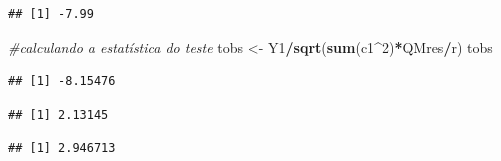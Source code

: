 \documentclass[
]{book}
\newenvironment{Shaded}{\begin{snugshade}}{\end{snugshade}}
\newcommand{\CommentTok}[1]{\textcolor[rgb]{0.56,0.35,0.01}{\textit{#1}}}
\newcommand{\DecValTok}[1]{\textcolor[rgb]{0.00,0.00,0.81}{#1}}
\newcommand{\FloatTok}[1]{\textcolor[rgb]{0.00,0.00,0.81}{#1}}
\newcommand{\KeywordTok}[1]{\textcolor[rgb]{0.13,0.29,0.53}{\textbf{#1}}}
\newcommand{\NormalTok}[1]{#1}
\newcommand{\OperatorTok}[1]{\textcolor[rgb]{0.81,0.36,0.00}{\textbf{#1}}}
\newcommand{\StringTok}[1]{\textcolor[rgb]{0.31,0.60,0.02}{#1}}
\begin{document}
\begin{verbatim}
## [1] -7.99
\end{verbatim}

\begin{Shaded}
\begin{Highlighting}[]
\CommentTok{#calculando a estatística do teste}
\NormalTok{tobs <-}\StringTok{ }\NormalTok{Y1}\OperatorTok{/}\KeywordTok{sqrt}\NormalTok{(}\KeywordTok{sum}\NormalTok{(c1}\OperatorTok{^}\DecValTok{2}\NormalTok{)}\OperatorTok{*}\NormalTok{QMres}\OperatorTok{/}\NormalTok{r)}
\NormalTok{tobs}
\end{Highlighting}
\end{Shaded}

\begin{verbatim}
## [1] -8.15476
\end{verbatim}

\begin{Shaded}
\end{Shaded}

\begin{verbatim}
## [1] 2.13145
\end{verbatim}

\begin{Shaded}
\end{Shaded}

\begin{verbatim}
## [1] 2.946713
\end{verbatim}
\end{document}
